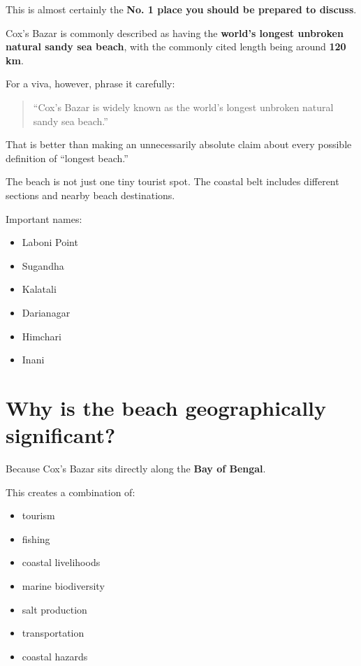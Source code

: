 This is almost certainly the \textbf{No. 1 place you should be prepared to discuss}.

Cox's Bazar is commonly described as having the \textbf{world's longest unbroken natural sandy sea beach}, with the commonly cited length being around \textbf{120 km}.

For a viva, however, phrase it carefully:

\begin{quote}
``Cox's Bazar is widely known as the world's longest unbroken natural sandy sea beach.''\\
\end{quote}

That is better than making an unnecessarily absolute claim about every possible definition of ``longest beach.''

The beach is not just one tiny tourist spot. The coastal belt includes different sections and nearby beach destinations.

Important names:

\begin{itemize}
  \item Laboni Point
  \item Sugandha
  \item Kalatali
  \item Darianagar
  \item Himchari
  \item Inani
\end{itemize}

\medskip

\section{Why is the beach geographically significant?}

Because Cox's Bazar sits directly along the \textbf{Bay of Bengal}.

This creates a combination of:

\begin{itemize}
  \item tourism
  \item fishing
  \item coastal livelihoods
  \item marine biodiversity
  \item salt production
  \item transportation
  \item coastal hazards
\end{itemize}

